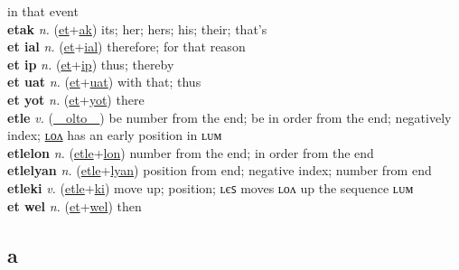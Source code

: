 in that event \label{et ayf} \\
\textbf{etak} \textit{n.} (\hyperref[et]{et}+\hyperref[ak]{ak})
its; her; hers; his; their; that’s \label{etak} \\
\textbf{et ial} \textit{n.} (\hyperref[et]{et}+\hyperref[al]{ial})
therefore; for that reason \label{et ial} \\
\textbf{et ip} \textit{n.} (\hyperref[et]{et}+\hyperref[p]{ip})
thus; thereby \label{et ip} \\
\textbf{et uat} \textit{n.} (\hyperref[et]{et}+\hyperref[at]{uat})
with that; thus \label{et uat} \\
\textbf{et yot} \textit{n.} (\hyperref[et]{et}+\hyperref[ot]{yot})
there \label{et yot} \\
\textbf{etle} \textit{v.} (\hyperref[olto]{~~olto~~})
be number from the end; be in order from the end; negatively index; \hyperref[etlelon]{ʟᴏᴧ} has an early position in ʟᴜᴍ \label{etle} \\
\textbf{etlelon} \textit{n.} (\hyperref[etle]{etle}+\hyperref[lon]{lon})
number from the end; in order from the end \label{etlelon} \\
\textbf{etlelyan} \textit{n.} (\hyperref[etle]{etle}+\hyperref[lyan]{lyan})
position from end; negative index; number from end \label{etlelyan} \\
\textbf{etleki} \textit{v.} (\hyperref[etle]{etle}+\hyperref[ki]{ki})
move up; position; ʟєꜱ moves ʟᴏᴧ up the sequence ʟᴜᴍ \label{etleki} \\
\textbf{et wel} \textit{n.} (\hyperref[et]{et}+\hyperref[el]{wel})
then \label{et wel} \\
\subsection{a}

